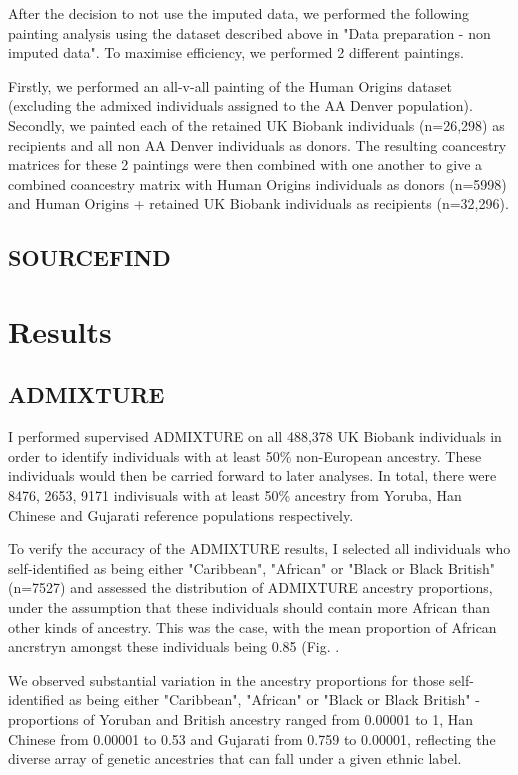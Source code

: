 After the decision to not use the imputed data, we performed the following painting analysis using the dataset described above in "Data preparation - non imputed data". To maximise efficiency, we performed 2 different paintings.

Firstly, we performed an all-v-all painting of the Human Origins dataset (excluding the admixed individuals assigned to the AA Denver population). Secondly, we painted each of the retained UK Biobank individuals (n=26,298) as recipients and all non AA Denver individuals as donors. The resulting coancestry matrices for these 2 paintings were then combined with one another to give a combined coancestry matrix with Human Origins individuals as donors (n=5998) and Human Origins + retained UK Biobank individuals as recipients (n=32,296).

\subsection{SOURCEFIND}

\section{Results}

\subsection{ADMIXTURE}

I performed supervised ADMIXTURE on all 488,378 UK Biobank individuals in order to identify individuals with at least 50\% non-European ancestry. These individuals would then be carried forward to later analyses. In total, there were 8476, 2653, 9171 indivisuals with at least 50\% ancestry from Yoruba, Han Chinese and Gujarati reference populations respectively. 

To verify the accuracy of the ADMIXTURE results, I selected all individuals who self-identified as being either "Caribbean", "African" or "Black or Black British" (n=7527) and assessed the distribution of ADMIXTURE ancestry proportions, under the assumption that these individuals should contain more African than other kinds of ancestry. This was the case, with the mean proportion of African ancrstryn amongst these individuals being 0.85 (Fig. \cite{African_Inds_proportions_ADMIXTURE}.

We observed substantial variation in the ancestry proportions for those self-identified as being either "Caribbean", "African" or "Black or Black British" - proportions of Yoruban and British ancestry ranged from 0.00001 to 1, Han Chinese from 0.00001 to 0.53 and Gujarati from 0.759 to 0.00001, reflecting the diverse array of genetic ancestries that can fall under a given ethnic label.


